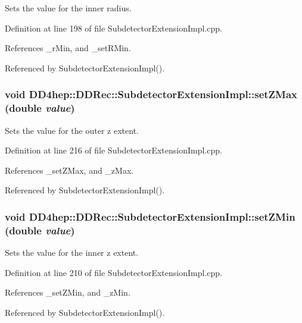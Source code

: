 Sets the value for the inner radius. 

Definition at line 198 of file SubdetectorExtensionImpl.cpp.

References \_\-rMin, and \_\-setRMin.

Referenced by SubdetectorExtensionImpl().\hypertarget{class_d_d4hep_1_1_d_d_rec_1_1_subdetector_extension_impl_ad4ff27b7c8cf4e9f0cdcd595fb271226}{
\subsubsection[{setZMax}]{\setlength{\rightskip}{0pt plus 5cm}void DD4hep::DDRec::SubdetectorExtensionImpl::setZMax (double {\em value})}}
\label{class_d_d4hep_1_1_d_d_rec_1_1_subdetector_extension_impl_ad4ff27b7c8cf4e9f0cdcd595fb271226}


Sets the value for the outer z extent. 

Definition at line 216 of file SubdetectorExtensionImpl.cpp.

References \_\-setZMax, and \_\-zMax.

Referenced by SubdetectorExtensionImpl().\hypertarget{class_d_d4hep_1_1_d_d_rec_1_1_subdetector_extension_impl_a36879a3796e4eeccdc1d2ec1050894a8}{
\subsubsection[{setZMin}]{\setlength{\rightskip}{0pt plus 5cm}void DD4hep::DDRec::SubdetectorExtensionImpl::setZMin (double {\em value})}}
\label{class_d_d4hep_1_1_d_d_rec_1_1_subdetector_extension_impl_a36879a3796e4eeccdc1d2ec1050894a8}


Sets the value for the inner z extent. 

Definition at line 210 of file SubdetectorExtensionImpl.cpp.

References \_\-setZMin, and \_\-zMin.

Referenced by SubdetectorExtensionImpl().

